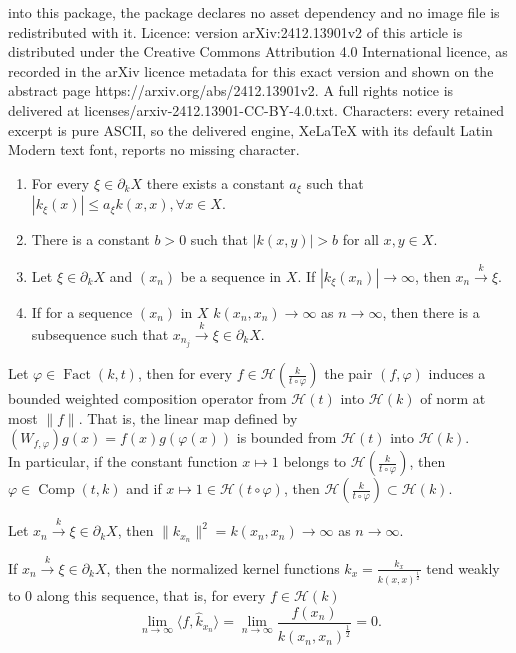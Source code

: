 \documentclass[10pt,a4paper]{amsart}
\DeclareMathOperator{\Comp}{Comp}
\DeclareMathOperator{\Fact}{Fact}
\newcommand{\Hilbert}{\mathcal{H}}
\newcommand{\la}{\langle}
\newcommand{\rand}{\partial}
\newcommand{\ra}{\rangle}
\newcommand{\xto}[1]{\stackrel{#1}{\to}}
\renewcommand{\phi}{\varphi}
\begin{document}
into this package, the package declares no asset dependency and no image file is redistributed with it. Licence: version arXiv:2412.13901v2 of this article is distributed under the Creative Commons Attribution 4.0 International licence, as recorded in the arXiv licence metadata for this exact version and shown on the abstract page https://arxiv.org/abs/2412.13901v2. A full rights notice is delivered at licenses/arxiv-2412.13901-CC-BY-4.0.txt. Characters: every retained excerpt is pure ASCII, so the delivered engine, XeLaTeX with its default Latin Modern text font, reports no missing character.
\begin{enumerate}[label=(\Alph*)]
\item\label{boundary-to-diagonal}
For every $\xi\in\rand_kX$ there exists a constant $a_\xi$ such that
$|k_\xi(x)| \leq a_\xi k(x,x), \forall x\in X.$
\item\label{constants-inclusion}
There is a constant $b>0$ such that $|k(x,y)|>b$ for all $x,y\in X$.
\item\label{isolated-singularity}
Let $\xi\in\rand_kX$ and $(x_n)$ be a sequence in $X$. If $|k_\xi(x_n)|\to\infty$,
then $x_n\xto{k}\xi$.
\item\label{compact-boundary}
If for a sequence $(x_n)$ in $X$ $k(x_n,x_n)\to\infty$ as $n\to\infty$,
then there is a subsequence such that $x_{n_j}\xto{k}\xi\in\rand_kX$.
\end{enumerate}

\begin{proposition}\label{proposition:weighted-composition}
Let $\phi\in\Fact(k,t)$, then for every $f\in\Hilbert(\frac{k}{t\circ\phi})$ the
pair $(f,\phi)$ induces a bounded weighted composition operator from $\Hilbert(t)$
into $\Hilbert(k)$ of norm at most $\|f\|$. That is, the linear map defined by
$(W_{f,\phi})g(x) = f(x)g(\phi(x))$ is bounded from $\Hilbert(t)$ into $\Hilbert(k)$.
\\ In particular, if the constant function $x\mapsto1$ belongs to $\Hilbert(\frac{k}{t\circ\phi})$,
then $\phi\in\Comp(t, k)$ and
if $x\mapsto1\in\Hilbert(t\circ\phi)$, then $\Hilbert(\frac{k}{t\circ\phi})\subset\Hilbert(k)$.
\end{proposition}

\begin{lemma}\label{lemma:boundary-explosion}
Let $x_n\xto{k}\xi\in\rand_kX$, then $\|k_{x_n}\|^2 = k(x_n,x_n)\to\infty$ as
$n\to\infty$.
\end{lemma}

\begin{lemma}\label{lemma:growth-restriction}
If $x_n\xto{k}\xi\in\rand_kX$, then the normalized kernel functions
$\hat k_x = \frac{k_x}{k(x,x)^\frac12}$ tend weakly to $0$ along this sequence,
that is, for every $f\in\Hilbert(k)$ \begin{equation}
	\lim_{n\to\infty}\la f,\hat k_{x_n}\ra
	= \lim_{n\to\infty}\frac{f(x_n)}{k(x_n,x_n)^\frac12}
	= 0.
\end{equation}
\end{lemma}
\end{document}
